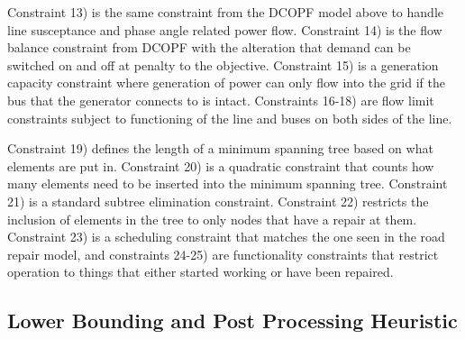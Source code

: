 \documentclass{article}
\begin{document}
	Constraint 13) is the same constraint from the DCOPF model above to handle line susceptance and phase angle related power flow. Constraint 14) is the flow balance constraint from DCOPF with the alteration that demand can be switched on and off at penalty to the objective. Constraint 15) is a generation capacity constraint where generation of power can only flow into the grid if the bus that the generator connects to is intact. Constraints 16-18) are flow limit constraints subject to functioning of the line and buses on both sides of the line.
	
	Constraint 19) defines the length of a minimum spanning tree based on what elements are put in. Constraint 20) is a quadratic constraint that counts how many elements need to be inserted into the minimum spanning tree. Constraint 21) is a standard subtree elimination constraint. Constraint 22) restricts the inclusion of elements in the tree to only nodes that have a repair at them. Constraint 23) is a scheduling constraint that matches the one seen in the road repair model, and constraints 24-25) are functionality constraints that restrict operation to things that either started working or have been repaired.
	\subsection{Lower Bounding and Post Processing Heuristic}
	
\end{document}
